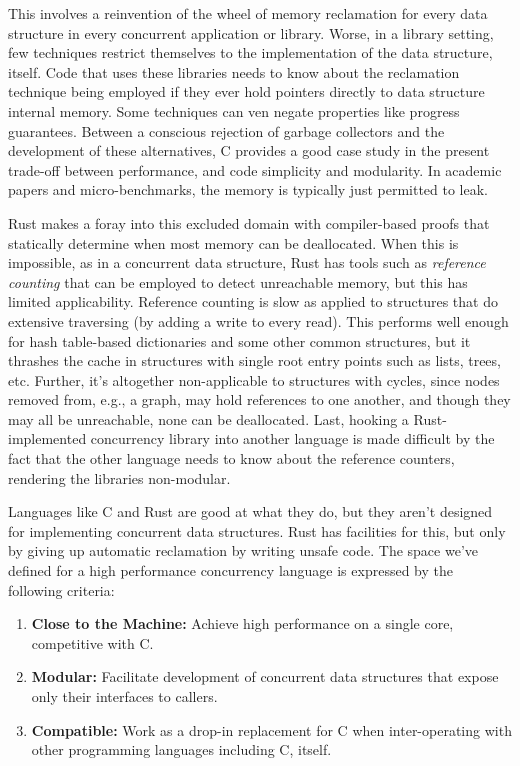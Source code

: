 This involves a reinvention of the wheel of memory reclamation for every data structure in every concurrent application or library.  Worse, in a library setting, few techniques restrict themselves to the implementation of the data structure, itself.  Code that uses these libraries needs to know about the reclamation technique being employed if they ever hold pointers directly to data structure internal memory.  Some techniques can ven negate properties like progress guarantees.\cite{Brown15}  Between a conscious rejection of garbage collectors and the development of these alternatives, C provides a good case study in the present trade-off between performance, and code simplicity and modularity.  In academic papers and micro-benchmarks, the memory is typically just permitted to leak.

Rust makes a foray into this excluded domain with compiler-based proofs that statically determine when most memory can be deallocated.\cite{Rust}  When this is impossible, as in a concurrent data structure, Rust has tools such as \textit{reference counting} that can be employed to detect unreachable memory, but this has limited applicability.  Reference counting is slow as applied to structures that do extensive traversing (by adding a write to every read).  This performs well enough for hash table-based dictionaries and some other common structures, but it thrashes the cache in structures with single root entry points such as lists, trees, etc.  Further, it's altogether non-applicable to structures with cycles, since nodes removed from, e.g., a graph, may hold references to one another, and though they may all be unreachable, none can be deallocated.  Last, hooking a Rust-implemented concurrency library into another language is made difficult by the fact that the other language needs to know about the reference counters, rendering the libraries non-modular.

Languages like C and Rust are good at what they do, but they aren't designed for implementing concurrent data structures.  Rust has facilities for this, but only by giving up automatic reclamation by writing unsafe code.  The space we've defined for a high performance concurrency language is expressed by the following criteria:

\begin{enumerate}
        \item \textbf{Close to the Machine:} Achieve high performance on a single core, competitive with C.
        \item \textbf{Modular:} Facilitate development of concurrent data structures that expose only their interfaces to callers.
        \item \textbf{Compatible:} Work as a drop-in replacement for C when inter-operating with other programming languages including C, itself.
\end{enumerate}


